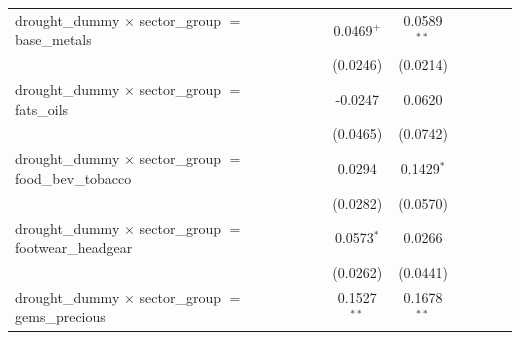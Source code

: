 \begin{tabular}{lcccccccc}
   drought\_dummy $\times$ sector\_group $=$ base\_metals                         &                       &                       & 0.0469$^{+}$          & 0.0589$^{**}$         &                       &                       &                       &   \\   
                                                                                  &                       &                       & (0.0246)              & (0.0214)              &                       &                       &                       &   \\   
   drought\_dummy $\times$ sector\_group $=$ fats\_oils                           &                       &                       & -0.0247               & 0.0620                &                       &                       &                       &   \\   
                                                                                  &                       &                       & (0.0465)              & (0.0742)              &                       &                       &                       &   \\   
   drought\_dummy $\times$ sector\_group $=$ food\_bev\_tobacco                   &                       &                       & 0.0294                & 0.1429$^{*}$          &                       &                       &                       &   \\   
                                                                                  &                       &                       & (0.0282)              & (0.0570)              &                       &                       &                       &   \\   
   drought\_dummy $\times$ sector\_group $=$ footwear\_headgear                   &                       &                       & 0.0573$^{*}$          & 0.0266                &                       &                       &                       &   \\   
                                                                                  &                       &                       & (0.0262)              & (0.0441)              &                       &                       &                       &   \\   
   drought\_dummy $\times$ sector\_group $=$ gems\_precious                       &                       &                       & 0.1527$^{**}$         & 0.1678$^{**}$         &                       &                       &                       &   \\   

\end{tabular}
